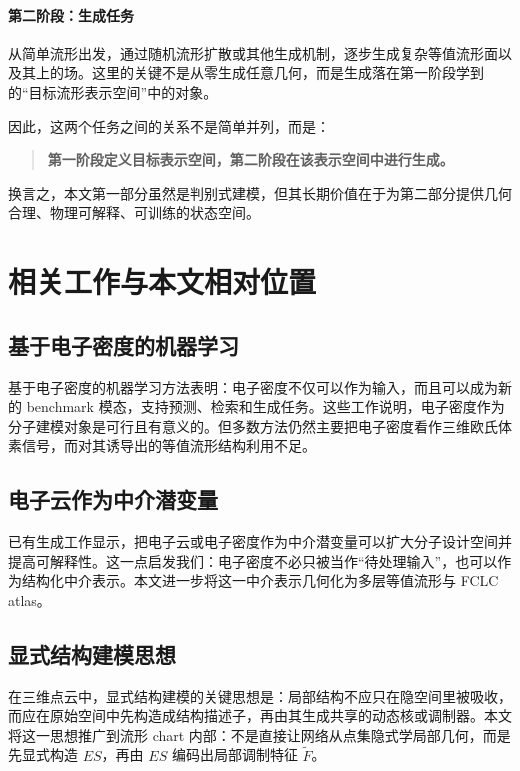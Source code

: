 \documentclass[12pt,a4paper]{ctexart}
\begin{document}
\paragraph{第二阶段：生成任务}
从简单流形出发，通过随机流形扩散或其他生成机制，逐步生成复杂等值流形面以及其上的场。这里的关键不是从零生成任意几何，而是生成落在第一阶段学到的“目标流形表示空间”中的对象。

因此，这两个任务之间的关系不是简单并列，而是：

\begin{quote}
\textbf{第一阶段定义目标表示空间，第二阶段在该表示空间中进行生成。}
\end{quote}

换言之，本文第一部分虽然是判别式建模，但其长期价值在于为第二部分提供几何合理、物理可解释、可训练的状态空间。

\section{相关工作与本文相对位置}

\subsection{基于电子密度的机器学习}
基于电子密度的机器学习方法表明：电子密度不仅可以作为输入，而且可以成为新的 benchmark 模态，支持预测、检索和生成任务。这些工作说明，电子密度作为分子建模对象是可行且有意义的。但多数方法仍然主要把电子密度看作三维欧氏体素信号，而对其诱导出的等值流形结构利用不足。

\subsection{电子云作为中介潜变量}
已有生成工作显示，把电子云或电子密度作为中介潜变量可以扩大分子设计空间并提高可解释性。这一点启发我们：电子密度不必只被当作“待处理输入”，也可以作为结构化中介表示。本文进一步将这一中介表示几何化为多层等值流形与 FCLC atlas。

\subsection{显式结构建模思想}
在三维点云中，显式结构建模的关键思想是：局部结构不应只在隐空间里被吸收，而应在原始空间中先构造成结构描述子，再由其生成共享的动态核或调制器。本文将这一思想推广到流形 chart 内部：不是直接让网络从点集隐式学局部几何，而是先显式构造 \(ES\)，再由 \(ES\) 编码出局部调制特征 \(\tilde F\)。
\end{document}
